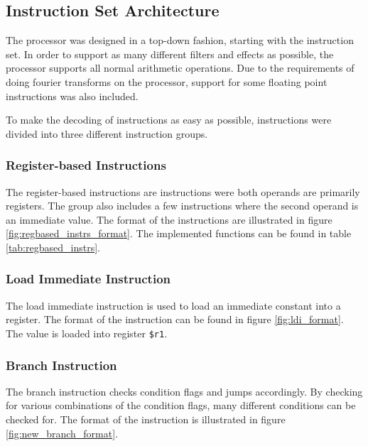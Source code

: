 \subsection{Instruction Set Architecture}\label{section:fpga-isa}

The processor was designed in a top-down fashion, starting with
the instruction set. In order to support as many different filters
and effects as possible, the processor supports all normal arithmetic
operations. Due to the requirements of doing fourier transforms on the
processor, support for some floating point instructions was also included.

To make the decoding of instructions as easy as possible, instructions
were divided into three different instruction groups.

\subsubsection{Register-based Instructions}

The register-based instructions are instructions were both operands are
primarily registers. The group also includes a few instructions where
the second operand is an immediate value. The format of the
instructions are illustrated in figure \ref{fig:regbased_instrs_format}. The
implemented functions can be found in table \ref{tab:regbased_instrs}.


\FloatBarrier

\FloatBarrier

\subsubsection{Load Immediate Instruction}
The load immediate instruction is used to load an immediate constant into a
register. The format of the instruction can be found in figure
\ref{fig:ldi_format}. The value is loaded into register \texttt{\$r1}.


\FloatBarrier

\subsubsection{Branch Instruction}
The branch instruction checks condition flags and jumps accordingly. By
checking for various combinations of the condition flags, many different
conditions can be checked for. The format of the instruction is illustrated
in figure \ref{fig:new_branch_format}. 

